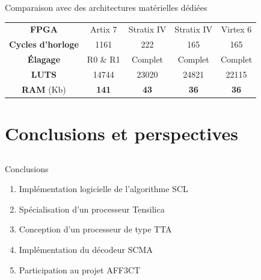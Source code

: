 \begin{frame}[c]{Comparaison avec des architectures matérielles dédiées}
{\begin{table}
{{\begin{tabular}{c|c|c|c|c}
          \textbf{FPGA}         &  Artix 7       & Stratix IV            & Stratix IV         & Virtex 6             \\
          \textbf{Cycles d'horloge}   &  1161          & 222                   & 165                & 165                  \\
          \textbf{\'Elagage}        &  R0 \& R1      & Complet                  & Complet               & Complet                  \\
          \textbf{LUTS}           &  14744         & 23020                 & 24821              & 22115                \\
          \textbf{RAM} (Kb)       &  \textbf{141}  & \textbf{43}           & \textbf{36}        & \textbf{36}          \\


        \end{tabular}
      }}
      \end{table}
    }
\end{frame}

\section{Conclusions et perspectives}
\subsection*{}

\begin{frame}[c]{Conclusions}

  \begin{enumerate}
\renewcommand{\section}[2]{} %

    \renewcommand*{\bibfont}{\scriptsize}
    \nocite{leonardon_fast_2017,ghaffari_improving_2017,leonardon_tta_2018,Ghaffari2018,cassagne_fast_2017,cassagne_gdr_2017}
    \vfill
    \item<+-> Implémentation logicielle de l'algorithme  SCL
    \scriptsize{\printbibliography[keyword={fast-scl}]}
    \vfill
    \item<+-> Spécialisation d'un processeur Tensilica
    \scriptsize{\printbibliography[keyword={leonardon}]}
    \vfill
    \item<+-> Conception d'un processeur de type TTA
    \scriptsize{\printbibliography[keyword={tta}]}
    \vfill
    \item<+-> Implémentation du décodeur SCMA
    \printbibliography[keyword={ghaffari}]
    \vfill
    \item<+-> Participation au projet AFF3CT
    \printbibliography[keyword={aff3ct}]
    \vfill
  \end{enumerate}

\end{frame}

